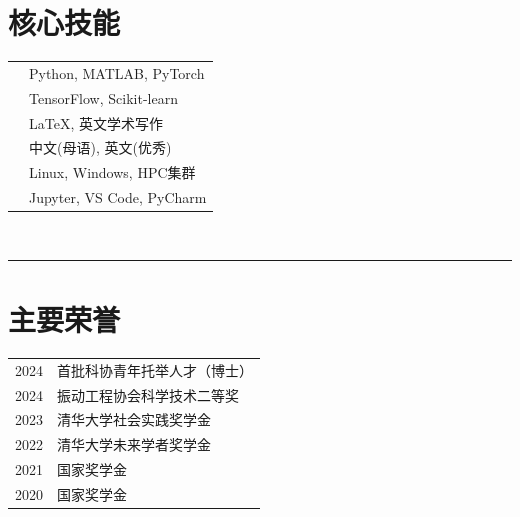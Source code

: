 \documentclass[oneside]{article}
\begin{document}
{\begin{minipage}[t][\textheight-2\fboxsep-2\fboxrule][t]{\dimexpr0.40\textwidth-2\fboxrule-2\fboxsep\relax}
        \section*{\large 核心技能}
        \begin{tabularx}{\textwidth}{cY}
            \faCode{}        & Python, MATLAB, PyTorch \\
            \faPen*{}        & TensorFlow, Scikit-learn \\
            \faFont{}        & LaTeX, 英文学术写作 \\
            \faLanguage{}    & 中文(母语), 英文(优秀) \\
            \faDesktop{}     & Linux, Windows, HPC集群 \\
            \faLaptopCode{}  & Jupyter, VS Code, PyCharm \\
        \end{tabularx}
        \vspace{1pt} \\
        \rule{\linewidth}{0.4pt}
        \section*{\large 主要荣誉}
        \begin{tabularx}{\textwidth}{cY}
            2024 & 首批科协青年托举人才（博士） \\
            2024 & 振动工程协会科学技术二等奖 \\
            2023 & 清华大学社会实践奖学金 \\
            2022 & 清华大学未来学者奖学金 \\
            2021 & 国家奖学金 \\
            2020 & 国家奖学金 \\
        \end{tabularx}
        \vspace{.3cm}
        \vfill
    \end{minipage}
}
\hfill
\end{document}
